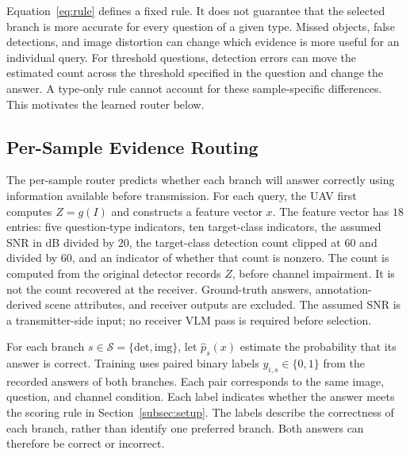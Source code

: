Equation~\eqref{eq:rule} defines a fixed rule. It does not guarantee
that the selected branch is more accurate for every question of a
given type. Missed objects, false detections, and image distortion can
change which evidence is more useful for an individual query.
For threshold questions, detection errors can move the estimated count
across the threshold specified in the question and change the answer. A type-only
rule cannot account for these sample-specific differences. This
motivates the learned router below.

\subsection{Per-Sample Evidence Routing}\label{subsec:persample}

The per-sample router predicts whether each branch will answer correctly
using information available before transmission. For each query, the
UAV first computes $Z=g(I)$ and constructs a feature vector $x$.
The feature vector has $18$ entries: five question-type indicators,
ten target-class indicators, the assumed SNR in dB divided by $20$,
the target-class detection count clipped at $60$ and divided by $60$,
and an indicator of whether that count is nonzero. The count is
computed from the original detector records $Z$, before channel
impairment. It is not the count recovered at the receiver.
Ground-truth answers, annotation-derived scene attributes, and
receiver outputs are excluded. The assumed SNR is a transmitter-side
input; no receiver VLM pass is required before selection.

For each branch $s\in\mathcal S=\{\mathrm{det},\mathrm{img}\}$, let
$\widehat p_s(x)$ estimate the probability that its answer is correct.
Training uses paired binary labels $y_{i,s}\in\{0,1\}$ from the
recorded answers of both branches. Each pair corresponds to the same
image, question, and channel condition. Each label indicates whether
the answer meets the scoring rule in Section~\ref{subsec:setup}.
The labels describe the correctness of each branch, rather than
identify one preferred branch. Both answers can therefore be correct
or incorrect.

